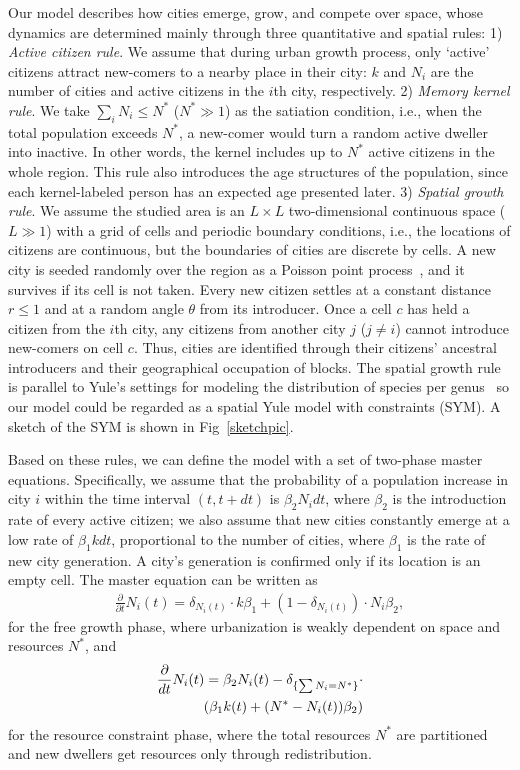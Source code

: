 Our model describes how cities emerge, grow, and compete over space, whose dynamics are determined mainly through three quantitative and spatial rules: 1) \textit{Active citizen rule}. We assume that during urban growth process, only `active' citizens attract new-comers to a nearby place in their city: $k$ and $N_i$ are the number of cities and active citizens in the $i$th city, respectively. 2) \textit{Memory kernel rule}. We take $\sum_{i} N_i \le N^*$ ($N^* \gg 1$) as the satiation condition, i.e., when the total population exceeds $N^*$, a new-comer would turn a random active dweller into inactive. In other words, the kernel includes up to $N^*$ active citizens in the whole region. This rule also introduces the age structures of the population, since each kernel-labeled person has an expected age presented later. 3) \emph{Spatial growth rule}. We assume the studied area is an $L\times L$ two-dimensional continuous space ($L\gg 1$) with a grid of cells and periodic boundary conditions, i.e., the locations of citizens are continuous, but the boundaries of cities are discrete by cells. A new city is seeded randomly over the region as a Poisson point process~\cite{miles1970homogeneous}, and it survives if its cell is not taken. Every new citizen settles at a constant distance $r\le 1$ and at a random angle $\theta$ from its introducer. Once a cell $c$ has held a citizen from the $i$th city, any citizens from another city $j$ ($j\ne i$) cannot introduce new-comers on cell $c$. Thus, cities are identified through their citizens' ancestral introducers and their geographical occupation of blocks. The spatial growth rule is parallel to Yule's settings for modeling the distribution of species per genus~\cite{yule1925ii} so our model could be regarded as a spatial Yule model with constraints (SYM). A sketch of the SYM is shown in Fig~\ref{sketchpic}.

Based on these rules, we can define the model with a set of two-phase master equations. Specifically, we assume that the probability of a population increase in city $i$ within the time interval $(t,t+dt)$ is $\beta_2N_idt$, where $\beta_2$ is the introduction rate of every active citizen; we also assume that new cities constantly emerge at a low rate of $\beta_1kdt$, proportional to the number of cities, where $\beta_1$ is the rate of new city generation. A city's generation is confirmed only if its location is an empty cell. The master equation can be written as \begin{align}\frac{\partial}{\partial t}N_i(t) =  \delta_{N_i(t)}\cdot k\beta_1+ (1-\delta_{N_i(t)})\cdot N_i\beta_2, \end{align} for the free growth phase, where urbanization is weakly dependent on space and resources $N^*$,
and \begin{align}
\frac{\partial}{dt} N_i(t) = \beta_2 N_i(t) -\delta_{\{\sum N_i = N^*\}}\cdot\notag \\ \left(\beta_1k(t) + (N^*-N_i(t))\beta_2 \right)
\end{align}
for the resource constraint phase, where the total resources $N^*$ are partitioned and new dwellers get resources only through redistribution. 

